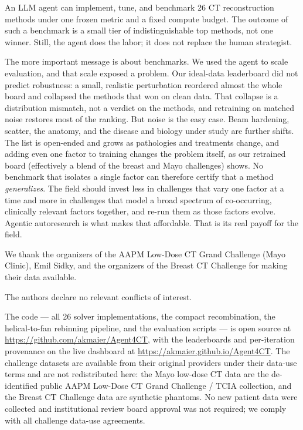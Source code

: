 \documentclass[AMA,twocolumn]{USG} %
\begin{document}
An LLM agent can implement, tune, and benchmark 26 CT reconstruction methods under one frozen metric and a fixed compute budget. The outcome of such a benchmark is a small tier of indistinguishable top methods, not one winner. Still, the agent does the labor; it does not replace the human strategist.

The more important message is about benchmarks. We used the agent to scale evaluation, and that scale exposed a problem. Our ideal-data leaderboard did not predict robustness: a small, realistic perturbation reordered almost the whole board and collapsed the methods that won on clean data. That collapse is a distribution mismatch, not a verdict on the methods, and retraining on matched noise restores most of the ranking. But noise is the easy case. Beam hardening, scatter, the anatomy, and the disease and biology under study are further shifts. The list is open-ended and grows as pathologies and treatments change, and adding even one factor to training changes the problem itself, as our retrained board (effectively a blend of the breast and Mayo challenges) shows. No benchmark that isolates a single factor can therefore certify that a method \emph{generalizes}. The field should invest less in challenges that vary one factor at a time and more in challenges that model a broad spectrum of co-occurring, clinically relevant factors together, and re-run them as those factors evolve. Agentic autoresearch is what makes that affordable. That is its real payoff for the field.

We thank the organizers of the AAPM Low-Dose CT Grand Challenge (Mayo Clinic), Emil Sidky, and the organizers of the Breast CT Challenge for making their data available.

The authors declare no relevant conflicts of interest.

The code --- all 26 solver implementations, the compact recombination, the helical-to-fan rebinning pipeline, and the evaluation scripts --- is open source at \url{https://github.com/akmaier/Agent4CT}, with the leaderboards and per-iteration provenance on the live dashboard at \url{https://akmaier.github.io/Agent4CT}. The challenge datasets are available from their original providers under their data-use terms and are not redistributed here: the Mayo low-dose CT data are the de-identified public AAPM Low-Dose CT Grand Challenge / TCIA collection, and the Breast CT Challenge data are synthetic phantoms. No new patient data were collected and institutional review board approval was not required; we comply with all challenge data-use agreements.


\end{document}

